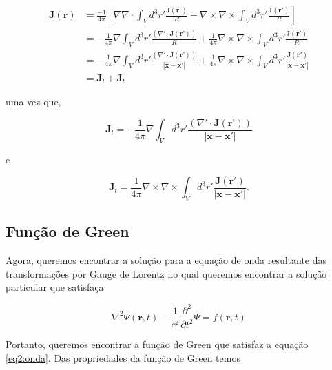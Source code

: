 \begin{equation}
	\begin{split}
		\textbf{J}(\textbf{r}) & = \frac{-1}{4\pi} \left[\nabla \nabla \cdot \int_V d^3r'\frac{\textbf{J}(\textbf{r}')}{R} - \nabla \times \nabla \times \int_V d^3r'\frac{\textbf{J}(\textbf{r}')}{R} \right]\\
		& = -\frac{1}{4\pi} \nabla \int_V d^3r'\frac{\left( \nabla' \cdot \textbf{J}(\textbf{r'})\right)}{R} + \frac{1}{4\pi}\nabla \times \nabla \times \int_V d^3r'\frac{\textbf{J}(\textbf{r}')}{R}\\
		& = -\frac{1}{4\pi} \nabla \int_V d^3r'\frac{\left( \nabla' \cdot \textbf{J}(\textbf{r'})\right)}{|\textbf{x}-\textbf{x}'|} + \frac{1}{4\pi}\nabla \times \nabla \times \int_V d^3r'\frac{\textbf{J}(\textbf{r}')}{|\textbf{x}-\textbf{x}'|}\\
		& = \textbf{J}_l + \textbf{J}_t
	\end{split}
\end{equation}

uma vez que,

\begin{equation}
	\textbf{J}_l = -\frac{1}{4\pi} \nabla \int_V d^3r'\frac{\left( \nabla' \cdot \textbf{J}(\textbf{r'})\right)}{|\textbf{x}-\textbf{x}'|}
\end{equation}

e

\begin{equation}
	\textbf{J}_t =  \frac{1}{4\pi}\nabla \times \nabla \times \int_V d^3r'\frac{\textbf{J}(\textbf{r}')}{|\textbf{x}-\textbf{x}'|}.
\end{equation}


\subsection*{Função de Green}

Agora, queremos encontrar a solução para a equação de onda resultante das transformações por Gauge de Lorentz no qual queremos encontrar a solução particular que satisfaça

\begin{equation}
	\nabla ^2 \Psi (\textbf{r},t) -\frac{1}{c^2}\frac{\partial^2}{\partial t^2} \Psi = 
	f(\textbf{r},t) 
	\label{eq2:onda}
\end{equation}

Portanto, queremos encontrar a função de Green que satisfaz a equação \ref{eq2:onda}. Das propriedades da função de Green temos

